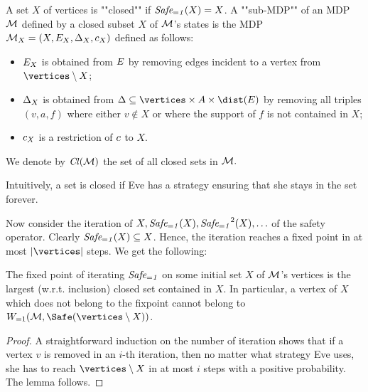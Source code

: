 \begin{definition}
\label{5-def:closed_set_MDP}
A set $X$ of vertices is ""closed"" if $ \mathit{Safe_{=1}}(X)=X$. A ""sub-MDP"" of an MDP $ \mathcal{M} $ defined by a closed subset $X$ of $ \mathcal{M} $'s states is the MDP $\mathcal{M}_X = (X,E_X,\Delta_X,c_X)$ defined as follows:
\begin{itemize}
	\item $E_X$ is obtained from $E$ by removing edges incident to a vertex from $\vertices\setminus X$;
	\item $\Delta_X$ is obtained from $\probTranFunc\subseteq \vertices\times\actions\times\dist(\edges)$ by removing all triples $(v,a,f)$ where either $v\not \in X$ or where the support of $f$ is not contained in $X$;
	\item $c_X$ is a restriction of $c$ to $X$.
\end{itemize}
We denote by $\mathit{Cl}(\mathcal{M})$ the set of all closed sets in $\mathcal{M}.$
\end{definition}

Intuitively, a set is closed if Eve has a strategy ensuring that she stays in the set forever.



Now consider the iteration of $ X, \mathit{Safe_{=1}}(X),\mathit{Safe_{=1}}^2(X),\ldots $ of the safety operator. Clearly $\mathit{Safe_{=1}}(X)\subseteq X$. Hence, the iteration reaches a fixed point in at most $|\vertices|$ steps. We get the following:

\begin{lemma}
\label{5-lem:safety-iteration}
The fixed point of iterating $ \mathit{Safe_{=1}} $ on some initial set $ X $ of $ \mathcal{M} $'s vertices is the largest (w.r.t. inclusion) closed set contained in $ X $. In particular, a vertex of $ X $ which does not belong to the fixpoint cannot belong to  $\winAS(\mdp,\Safe(\vertices \setminus X))$.
\end{lemma}
\begin{proof}
A straightforward induction on the number of iteration shows that if a vertex $ v $ is removed in an $ i $-th iteration, then no matter what strategy Eve uses, she has to reach $ \vertices\setminus X $ in at most $ i $ steps with a positive probability. The lemma follows.
\end{proof}


%



